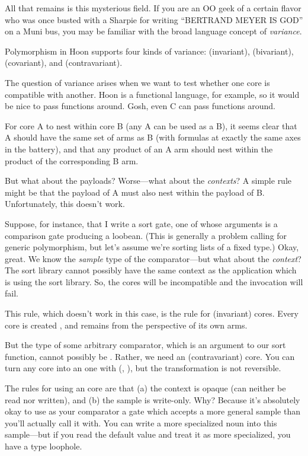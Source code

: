 All that remains is this mysterious  field.  If you are an OO
geek of a certain flavor who was once busted with a Sharpie for
writing ``BERTRAND MEYER IS GOD'' on a Muni bus, you may be
familiar with the broad language concept of \emph{variance}.

Polymorphism in Hoon supports four kinds of variance: 
(invariant),  (bivariant),  (covariant), and
 (contravariant).

The question of variance arises when we want to test whether one
core is compatible with another.  Hoon is a functional language,
for example, so it would be nice to pass functions around.  Gosh,
even C can pass functions around.

For core A to nest within core B (any A can be used as a B), it
seems clear that A should have the same set of arms as B (with
formulas at exactly the same axes in the battery), and that any
product of an A arm should nest within the product of the
corresponding B arm.

But what about the payloads?  Worse---what about the \emph{contexts}?
A simple rule might be that the payload of A must also nest
within the payload of B.  Unfortunately, this doesn't work.

Suppose, for instance, that I write a sort gate, one of whose
arguments is a comparison gate producing a loobean.  (This is
generally a problem calling for generic polymorphism, but let's
assume we're sorting lists of a fixed type.)  Okay, great.  We
know the \emph{sample} type of the comparator---but what about the
\emph{context}?  The sort library cannot possibly have the same
context as the application which is using the sort library.  So,
the cores will be incompatible and the invocation will fail.

This rule, which doesn't work in this case, is the rule for
 (invariant) cores.  Every core is created , and
remains  from the perspective of its own arms.

But the type of some arbitrary comparator, which is an argument
to our sort function, cannot possibly be .  Rather, we
need an  (contravariant) core.  You can turn any 
core into an  one with \kode{\ket \textbar{}} (, ), but the
transformation is not reversible.

The rules for using an  core are that (a) the context is
opaque (can neither be read nor written), and (b) the sample is
write-only.  Why?  Because it's absolutely okay to use as your
comparator a gate which accepts a more general sample than you'll
actually call it with.  You can write a more specialized noun
into this sample---but if you read the default value and treat it
as more specialized, you have a type loophole.

